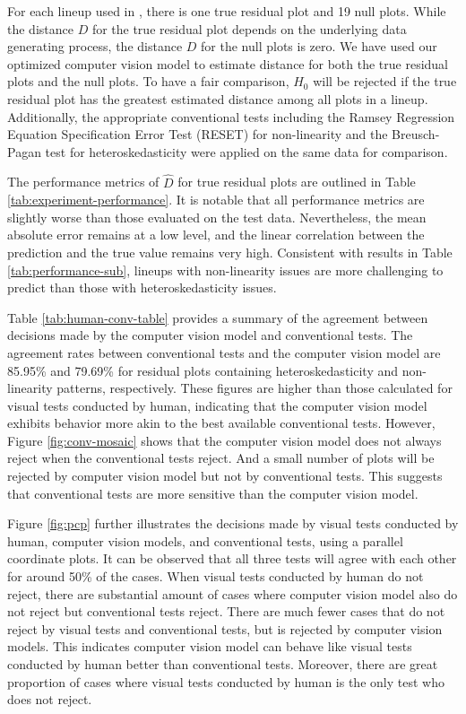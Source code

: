 \documentclass[]{interact}
\theoremstyle{plain}%
\theoremstyle{definition}
\theoremstyle{remark}
\begin{document}
For each lineup used in \citet{li2024plot}, there is one true residual
plot and 19 null plots. While the distance \(D\) for the true residual
plot depends on the underlying data generating process, the distance
\(D\) for the null plots is zero. We have used our optimized computer
vision model to estimate distance for both the true residual plots and
the null plots. To have a fair comparison, \(H_0\) will be rejected if
the true residual plot has the greatest estimated distance among all
plots in a lineup. Additionally, the appropriate conventional tests
including the Ramsey Regression Equation Specification Error Test
(RESET) \citep{ramsey1969tests} for non-linearity and the Breusch-Pagan
test \citep{breusch1979simple} for heteroskedasticity were applied on
the same data for comparison.

The performance metrics of \(\hat{D}\) for true residual plots are
outlined in Table \ref{tab:experiment-performance}. It is notable that
all performance metrics are slightly worse than those evaluated on the
test data. Nevertheless, the mean absolute error remains at a low level,
and the linear correlation between the prediction and the true value
remains very high. Consistent with results in Table
\ref{tab:performance-sub}, lineups with non-linearity issues are more
challenging to predict than those with heteroskedasticity issues.

Table \ref{tab:human-conv-table} provides a summary of the agreement
between decisions made by the computer vision model and conventional
tests. The agreement rates between conventional tests and the computer
vision model are 85.95\% and 79.69\% for residual plots containing
heteroskedasticity and non-linearity patterns, respectively. These
figures are higher than those calculated for visual tests conducted by
human, indicating that the computer vision model exhibits behavior more
akin to the best available conventional tests. However, Figure
\ref{fig:conv-mosaic} shows that the computer vision model does not
always reject when the conventional tests reject. And a small number of
plots will be rejected by computer vision model but not by conventional
tests. This suggests that conventional tests are more sensitive than the
computer vision model.

Figure \ref{fig:pcp} further illustrates the decisions made by visual
tests conducted by human, computer vision models, and conventional
tests, using a parallel coordinate plots. It can be observed that all
three tests will agree with each other for around 50\% of the cases.
When visual tests conducted by human do not reject, there are
substantial amount of cases where computer vision model also do not
reject but conventional tests reject. There are much fewer cases that do
not reject by visual tests and conventional tests, but is rejected by
computer vision models. This indicates computer vision model can behave
like visual tests conducted by human better than conventional tests.
Moreover, there are great proportion of cases where visual tests
conducted by human is the only test who does not reject.
\end{document}

